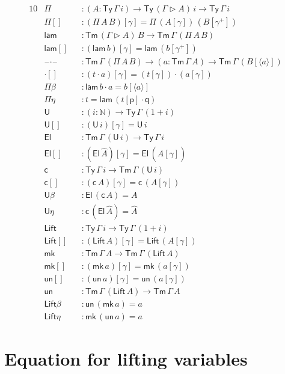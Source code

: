 \documentclass[a4paper,UKenglish]{article}
\newcommand{\ra}{\rightarrow}
\newcommand{\Ty}{\mathsf{Ty}}
\newcommand{\Tm}{\mathsf{Tm}}
\newcommand{\p}{\mathsf{p}}
\newcommand{\q}{\mathsf{q}}
\newcommand{\ext}{\mathop{\triangleright}}
\newcommand{\N}{\mathbb{N}}
\newcommand{\lam}{\mathsf{lam}}
\newcommand{\U}{\mathsf{U}}
\newcommand{\El}{\mathsf{El}}
\newcommand{\cd}{\mathsf{c}}
\newcommand{\blank}{\mathord{\hspace{1pt}\text{--}\hspace{1pt}}} %
\newcommand{\Lift}{\mathsf{Lift}}
\newcommand{\mk}{\mathsf{mk}}
\newcommand{\un}{\mathsf{un}}
\begin{document}
\begin{alignat*}{10}
  & \Pi && : (A:\Ty\,\Gamma\,i)\ra\Ty\,(\Gamma\ext A)\,i\ra\Ty\,\Gamma\,i \\
  & \Pi[] && : (\Pi\,A\,B)[\gamma] = \Pi\,(A[\gamma])\,(B[\gamma^+]) \\
  & \lam && : \Tm\,(\Gamma\ext A)\,B\ra\Tm\,\Gamma\,(\Pi\,A\,B) \\
  & \lam[] && : (\lam\,b)[\gamma] = \lam\,(b[\gamma^+]) \\
  & \blank\cdot\blank && : \Tm\,\Gamma\,(\Pi\,A\,B)\ra(a:\Tm\,\Gamma\,A)\ra\Tm\,\Gamma\,(B[\langle a\rangle]) \\
  & {\cdot}[] && : (t\cdot a)[\gamma] = (t[\gamma])\cdot(a[\gamma]) \\
  & \Pi\beta && : \lam\,b\cdot a = b[\langle a\rangle] \\
  & \Pi\eta && : t = \lam\,(t[\p]\cdot\q) \\
  & \U && : (i:\N)\ra\Ty\,\Gamma\,(1+i) \\
  & \U[] && : (\U\,i)[\gamma] = \U\,i \\  
  & \El && : \Tm\,\Gamma\,(\U\,i) \ra \Ty\,\Gamma\,i \\
  & \El[] && : (\El\,\hat{A})[\gamma] = \El\,(\hat{A}[\gamma]) \\
  & \cd && : \Ty\,\Gamma\,i\ra\Tm\,\Gamma\,(\U\,i) \\
  & \cd[] && : (\cd\,A)[\gamma] = \cd\,(A[\gamma]) \\
  & \U\beta && : \El\,(\cd\,A) = A \\
  & \U\eta && : \cd\,(\El\,\hat{A}) = \hat{A} \\
  & \Lift && : \Ty\,\Gamma\,i\ra\Ty\,\Gamma\,(1+i) \\
  & \Lift[] && : (\Lift\,A)[\gamma] = \Lift\,(A[\gamma]) \\
  & \mk && : \Tm\,\Gamma\,A \ra \Tm\,\Gamma\,(\Lift\,A) \\
  & \mk[] && : (\mk\,a)[\gamma] = \mk\,(a[\gamma]) \\
  & \un[] && : (\un\,a)[\gamma] = \un\,(a[\gamma]) \\
  & \un && : \Tm\,\Gamma\,(\Lift\,A) \ra \Tm\,\Gamma\,A \\
  & \Lift\beta && : \un\,(\mk\,a) = a \\
  & \Lift\eta && : \mk\,(\un\,a) = a
\end{alignat*}

\section{Equation for lifting variables}
\label{app:liftvar}
\end{document}
